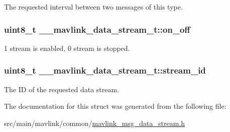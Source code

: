 The requested interval between two messages of this type. 

\hypertarget{struct____mavlink__data__stream__t_ae0ec7bd3a3fd38496e2a6aaa3b39daca}{
\subsubsection[{on\+\_\+off}]{\setlength{\rightskip}{0pt plus 5cm}uint8\+\_\+t \+\_\+\+\_\+mavlink\+\_\+data\+\_\+stream\+\_\+t\+::on\+\_\+off}}\label{struct____mavlink__data__stream__t_ae0ec7bd3a3fd38496e2a6aaa3b39daca}


1 stream is enabled, 0 stream is stopped. 

\hypertarget{struct____mavlink__data__stream__t_aaac4584f5e5677fe70edee1c53565b53}{
\subsubsection[{stream\+\_\+id}]{\setlength{\rightskip}{0pt plus 5cm}uint8\+\_\+t \+\_\+\+\_\+mavlink\+\_\+data\+\_\+stream\+\_\+t\+::stream\+\_\+id}}\label{struct____mavlink__data__stream__t_aaac4584f5e5677fe70edee1c53565b53}


The I\+D of the requested data stream. 



The documentation for this struct was generated from the following file\+:\begin{DoxyCompactItemize}
\item 
src/main/mavlink/common/\hyperlink{mavlink__msg__data__stream_8h}{mavlink\+\_\+msg\+\_\+data\+\_\+stream.\+h}\end{DoxyCompactItemize}
